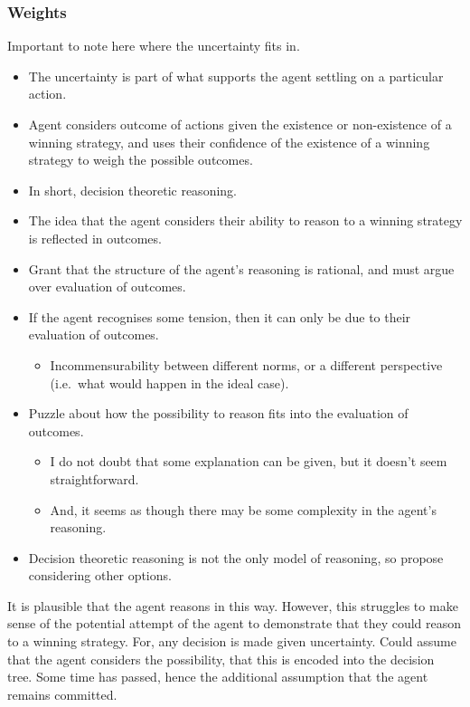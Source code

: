 \documentclass[10pt]{article}
\newcommand{\hozlinedash}[0]{%
  \noindent\hdashrule[0.5ex][c]{\textwidth}{.1pt}{2.5pt}
}
\begin{document}
\subsubsection{Weights}
\label{sec:weights}

\begin{note}
  Important to note here where the uncertainty fits in.
  \begin{itemize}
  \item The uncertainty is part of what supports the agent settling on a particular action.
  \end{itemize}
\end{note}

\begin{itemize}
\item Agent considers outcome of actions given the existence or non-existence of a winning strategy, and uses their confidence of the existence of a winning strategy to weigh the possible outcomes.
\item In short, decision theoretic reasoning.
\item The idea that the agent considers their ability to reason to a winning strategy is reflected in outcomes.
\item Grant that the structure of the agent's reasoning is rational, and must argue over evaluation of outcomes.
\item If the agent recognises some tension, then it can only be due to their evaluation of outcomes.
  \begin{itemize}
  \item Incommensurability between different norms, or a different perspective (i.e.\ what would happen in the ideal case).
  \end{itemize}
\item Puzzle about how the possibility to reason fits into the evaluation of outcomes.
  \begin{itemize}
  \item I do not doubt that some explanation can be given, but it doesn't seem straightforward.
  \item And, it seems as though there may be some complexity in the agent's reasoning.
  \end{itemize}
\item Decision theoretic reasoning is not the only model of reasoning, so propose considering other options.
\end{itemize}

\hozlinedash

It is plausible that the agent reasons in this way.
However, this struggles to make sense of the potential attempt of the agent to demonstrate that they could reason to a winning strategy.
For, any decision is made given uncertainty.
Could assume that the agent considers the possibility, that this is encoded into the decision tree.
Some time has passed, hence the additional assumption that the agent remains committed.
\end{document}
